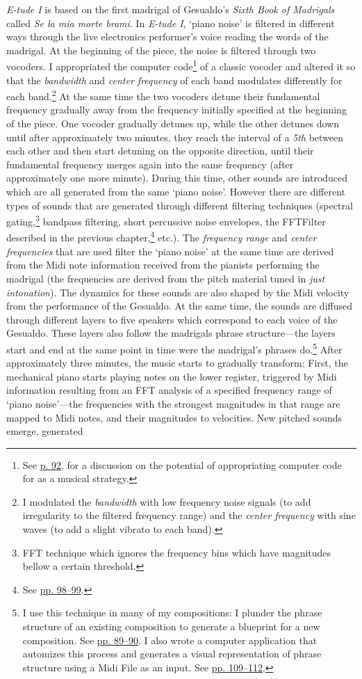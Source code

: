 \emph{E-tude I} is based on the first madrigal of Gesualdo's \emph{Sixth Book of Madrigals} called \emph{Se la mia morte brami}. In \emph{E-tude I}, `piano noise' is filtered in different ways through the live electronics performer's voice reading the words of the madrigal. At the beginning of the piece, the noise is filtered through two vocoders. I appropriated the computer code\footnote{See \hyperlink{codeapprop}{p. 92}, for a discussion on the potential of appropriating computer code for as a musical strategy.} of a classic vocoder and altered it so that the \emph{bandwidth} and \emph{center frequency} of each band modulates differently for each band.\footnote{I modulated the \emph{bandwidth} with low frequency noise signals (to add irregularity to the filtered frequency range) and the \emph{center frequency} with sine waves (to add a slight vibrato to each band).} At the same time the two vocoders detune their fundamental frequency gradually away from the frequency initially specified at the beginning of the piece. One vocoder gradually detunes up, while the other detunes down until after approximately two minutes, they reach the interval of a \emph{5th} between each other and then start detuning on the opposite direction, until their fundamental frequency merges again into the same frequency (after approximately one more minute). During this time, other sounds are introduced which are all generated from the same `piano noise'. However there are different types of sounds that are generated through different filtering techniques (spectral gating,\footnote{FFT technique which ignores the frequency bins which have magnitudes bellow a certain threshold.} bandpass filtering, short percussive noise envelopes, the FFTFilter described in the previous chapter,\footnote{See \hyperlink{fftfilter}{pp. 98--99}.} etc.). The \emph{frequency range} and \emph{center frequencies} that are used filter the `piano noise' at the same time are derived from the Midi note information received from the pianists performing the madrigal (the frequencies are derived from the pitch material tuned in \emph{just intonation}). The dynamics for these sounds are also shaped by the Midi velocity from the performance of the Gesualdo. At the same time, the sounds are diffused through different layers to five speakers which correspond to each voice of the Gesualdo. These layers also follow the madrigals phrase structure---the layers start and end at the same point in time were the madrigal's phrases do.\footnote{I use this technique in many of my compositions: I plunder the phrase structure of an existing composition to generate a blueprint for a new composition. See \hyperlink{macroplunder}{pp. 89--90}. I also wrote a computer application that automizes this process and generates a visual representation of phrase structure using a Midi File as an input. See \hyperlink{scorevisual}{pp. 109--112}.} After approximately three minutes, the music starts to gradually transform: First, the mechanical piano starts playing notes on the lower register, triggered by Midi information resulting from an FFT analysis of a specified frequency range of `piano noise'---the frequencies with the strongest magnitudes in that range are mapped to Midi notes, and their magnitudes to velocities. New pitched sounds emerge, generated 